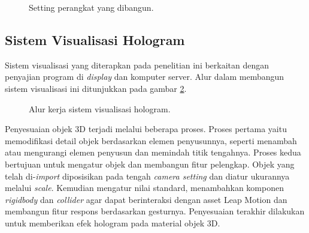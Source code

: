 \documentclass[conference]{IEEEtran}
\begin{document}
		\vspace{-4ex}
		\begin{figure}[h]
			\caption{Setting perangkat yang dibangun.}
			\label{fig:foto_alat}
		\end{figure}
	
	\subsection{Sistem Visualisasi Hologram}
		Sistem visualisasi yang diterapkan pada penelitian ini berkaitan dengan penyajian program di \textit{display} dan komputer server. Alur dalam membangun sistem visualisasi ini ditunjukkan pada gambar \ref{fig:desain_visualisasi}.
		\vspace{-2ex}
		\begin{figure} [h]
			\caption{Alur kerja sistem visualisasi hologram.}
			\label{fig:desain_visualisasi}
		\end{figure}
		\vspace{-2ex}
		
		Penyesuaian objek 3D terjadi melalui beberapa proses. Proses pertama yaitu memodifikasi detail objek berdasarkan elemen penyusunnya, seperti menambah atau mengurangi elemen penyusun dan memindah titik tengahnya. Proses kedua bertujuan untuk mengatur objek dan membangun fitur pelengkap. Objek yang telah di-\textit{import} diposisikan pada tengah \textit{camera setting} dan diatur ukurannya melalui \textit{scale}. Kemudian mengatur nilai standard, menambahkan komponen \textit{rigidbody} dan \textit{collider} agar dapat berinteraksi dengan asset Leap Motion dan membangun fitur respons berdasarkan gesturnya. Penyesuaian terakhir dilakukan untuk memberikan efek hologram pada material objek 3D. 
		
\end{document}
